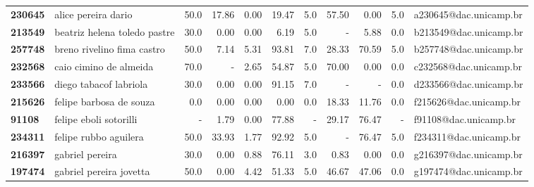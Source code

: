 \documentclass[11pt]{article}
\begin{document}
\begin{center}
\begin{landscape}
\begin{longtable}{llrrrrrrrrl}
\bottomrule
\endlastfoot
\textbf{230645} &                    alice pereira dario &                  50.0 &       17.86 &        0.00 &       19.47 &                      5.0 &       57.50 &        0.00 &                        5.0 &  a230645@dac.unicamp.br \\
\textbf{213549} &           beatriz helena toledo pastre &                  30.0 &        0.00 &        0.00 &        6.19 &                      5.0 &           - &        5.88 &                        0.0 &  b213549@dac.unicamp.br \\
\textbf{257748} &             breno rivelino fima castro &                  50.0 &        7.14 &        5.31 &       93.81 &                      7.0 &       28.33 &       70.59 &                        5.0 &  b257748@dac.unicamp.br \\
\textbf{232568} &                 caio cimino de almeida &                  70.0 &           - &        2.65 &       54.87 &                      5.0 &       70.00 &        0.00 &                        0.0 &  c232568@dac.unicamp.br \\
\textbf{233566} &                 diego tabacof labriola &                  30.0 &        0.00 &        0.00 &       91.15 &                      7.0 &           - &           - &                        0.0 &  d233566@dac.unicamp.br \\
\textbf{215626} &                felipe barbosa de souza &                   0.0 &        0.00 &        0.00 &        0.00 &                      0.0 &       18.33 &       11.76 &                        0.0 &  f215626@dac.unicamp.br \\
\textbf{91108 } &                 felipe eboli sotorilli &                     - &        1.79 &        0.00 &       77.88 &                        - &       29.17 &       76.47 &                          - &   f91108@dac.unicamp.br \\
\textbf{234311} &                  felipe rubbo aguilera &                  50.0 &       33.93 &        1.77 &       92.92 &                      5.0 &           - &       76.47 &                        5.0 &  f234311@dac.unicamp.br \\
\textbf{216397} &                        gabriel pereira &                  30.0 &        0.00 &        0.88 &       76.11 &                      3.0 &        0.83 &        0.00 &                        0.0 &  g216397@dac.unicamp.br \\
\textbf{197474} &                gabriel pereira jovetta &                  50.0 &        0.00 &        4.42 &       51.33 &                      5.0 &       46.67 &       47.06 &                        0.0 &  g197474@dac.unicamp.br \\

\end{longtable}
\end{landscape}
\end{center}
\end{document}
